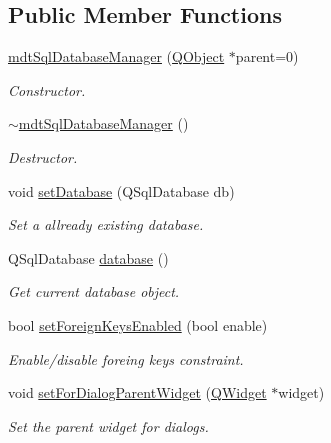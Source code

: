 \subsection*{Public Member Functions}
\begin{DoxyCompactItemize}
\item 
\hyperlink{classmdt_sql_database_manager_a8a9b487981f99ddc5d476776e5e0bb06}{mdt\-Sql\-Database\-Manager} (\hyperlink{class_q_object}{Q\-Object} $\ast$parent=0)
\begin{DoxyCompactList}\small\item\em Constructor. \end{DoxyCompactList}\item 
\hyperlink{classmdt_sql_database_manager_affd97fb8d28d07617e860d748ff57c5f}{$\sim$mdt\-Sql\-Database\-Manager} ()
\begin{DoxyCompactList}\small\item\em Destructor. \end{DoxyCompactList}\item 
void \hyperlink{classmdt_sql_database_manager_a6c6f2b1a7754193e3a9b80069c8df747}{set\-Database} (Q\-Sql\-Database db)
\begin{DoxyCompactList}\small\item\em Set a allready existing database. \end{DoxyCompactList}\item 
Q\-Sql\-Database \hyperlink{classmdt_sql_database_manager_a54755f29b7cd87746e34a107e60241c5}{database} ()
\begin{DoxyCompactList}\small\item\em Get current database object. \end{DoxyCompactList}\item 
bool \hyperlink{classmdt_sql_database_manager_a40638df04f9e6eb3c5cee399a5543ffd}{set\-Foreign\-Keys\-Enabled} (bool enable)
\begin{DoxyCompactList}\small\item\em Enable/disable foreing keys constraint. \end{DoxyCompactList}\item 
void \hyperlink{classmdt_sql_database_manager_a3da56635b2a4db98b768e5846e15fa83}{set\-For\-Dialog\-Parent\-Widget} (\hyperlink{class_q_widget}{Q\-Widget} $\ast$widget)
\begin{DoxyCompactList}\small\item\em Set the parent widget for dialogs. \end{DoxyCompactList}\item 

\end{DoxyCompactItemize}
